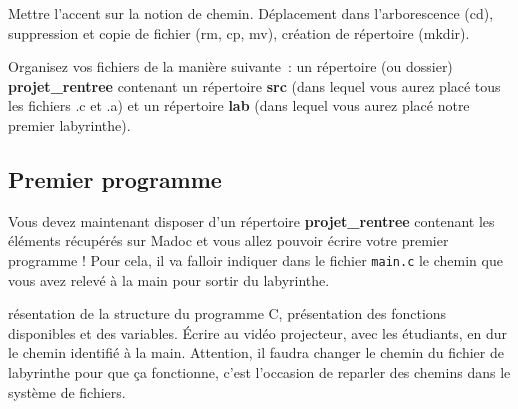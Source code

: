 \documentclass[a4paper]{article}
\newenvironment{enseignants}[1]{\noindent\color{blue}{\bf #1}}{}
\begin{document}
\begin{enseignants}{Système de fichiers~:}
  Mettre l'accent sur la notion de chemin.
  Déplacement dans l’arborescence (cd), suppression et copie de fichier (rm, cp, mv), création de répertoire (mkdir).
\end{enseignants}

Organisez vos fichiers de la manière suivante~: un répertoire (ou dossier) \textbf{projet\_rentree} contenant un répertoire \textbf{src} (dans lequel vous aurez placé tous les fichiers .c et .a) et un répertoire \textbf{lab} (dans lequel vous aurez placé notre premier labyrinthe).

\subsection{Premier programme}

Vous devez maintenant disposer d’un répertoire \textbf{projet\_rentree} contenant les éléments récupérés sur Madoc et vous allez pouvoir écrire votre premier programme !
Pour cela, il va falloir indiquer dans le fichier \texttt{main.c} le chemin que vous avez relevé à la main pour sortir du labyrinthe.

\begin{enseignants}
  Présentation de la structure du programme C, présentation des fonctions disponibles et des variables. Écrire au vidéo projecteur, avec les étudiants, en dur le chemin identifié à la main.
  Attention, il faudra changer le chemin du fichier de labyrinthe pour que ça fonctionne, c'est l'occasion de reparler des chemins dans le système de fichiers.
\end{enseignants}




\end{document}
